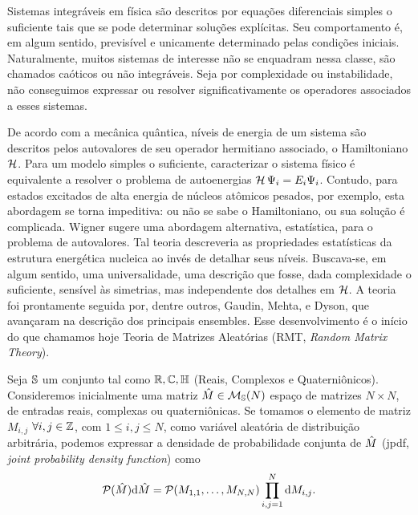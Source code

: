 \documentclass[12pt]{report}
\begin{document}
Sistemas integráveis em física são descritos por equações diferenciais simples o suficiente tais que se pode determinar soluções explícitas. Seu comportamento é, em algum sentido, previsível e unicamente determinado pelas condições iniciais. Naturalmente, muitos sistemas de interesse não se enquadram nessa classe, são chamados caóticos ou não integráveis. Seja por complexidade ou instabilidade, não conseguimos expressar ou resolver significativamente os operadores associados a esses sistemas. 

De acordo com a mecânica quântica, níveis de energia de um sistema são descritos pelos autovalores de seu operador hermitiano associado, o Hamiltoniano $\operatorname{\mathcal{H}}$. Para um modelo simples o suficiente, caracterizar o sistema físico é equivalente a resolver o problema de autoenergias $\operatorname{\mathcal{H}} \Psi_i = E_i \Psi_i$. Contudo, para estados excitados de alta energia de núcleos atômicos pesados, por exemplo, esta abordagem se torna impeditiva: ou não se sabe o Hamiltoniano, ou sua solução é complicada. Wigner sugere uma abordagem alternativa, estatística, para o problema de autovalores. Tal teoria descreveria as propriedades estatísticas da estrutura energética nucleica ao invés de detalhar seus níveis. Buscava-se, em algum sentido, uma universalidade, uma descrição que fosse, dada complexidade o suficiente, sensível às simetrias, mas independente dos detalhes em $\operatorname{\mathcal{H}}$. A teoria foi prontamente seguida por, dentre outros, Gaudin, Mehta, \cite{MehtaGaudin} e Dyson, \cite{Dyson} que avançaram na descrição dos principais ensembles. Esse desenvolvimento é o início do que chamamos hoje Teoria de Matrizes Aleatórias (RMT, \textit{Random Matrix Theory}).

Seja $\mathbb{S}$ um conjunto tal como $\mathbb{R}, \mathbb{C}, \mathbb{H} $ (Reais, Complexos e Quaterniônicos). Consideremos inicialmente uma matriz $\hat M \in \mathcal{M}_{\mathbb{S}}(N)$ espaço de matrizes $N \times N$, de entradas reais, complexas ou quaterniônicas. Se tomamos o elemento de matriz $M_{i,j}$ $\forall i, j \in \mathbb{Z}$, com $1 \leq i, j \leq N$, como variável aleatória de distribuição arbitrária, podemos expressar a densidade de probabilidade conjunta de $\hat M$ (jpdf, \textit{joint probability density function}) como $$\mathcal{P}(\hat{M}) \mathrm{d} \hat M = \mathcal{P}(M_{1,1}, \dots, M_{N,N}) \prod_{i,j=1}^{N} \mathrm{d} M_{i,j}.$$
\end{document}
